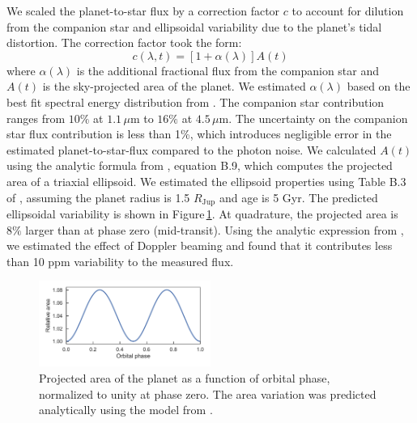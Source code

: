 \documentclass[twocolumn]{aastex61}
\begin{document}
We scaled the planet-to-star flux by a correction factor $c$ to account for dilution from the companion star and ellipsoidal variability due to the planet's tidal distortion. The correction factor took the form: 
\begin{equation}
	c(\lambda, t) = [1 + \alpha(\lambda)]A(t)
\end{equation}
where $\alpha(\lambda)$ is the additional fractional flux from the companion star and $A(t)$ is the sky-projected area of the planet. We estimated $\alpha(\lambda)$ based on the best fit spectral energy distribution from \cite{cartier17}. The companion star contribution ranges from $10\%$ at $1.1\,\mu$m to $16\%$ at $4.5\,\mu$m. The uncertainty on the companion star flux contribution is less than 1\%, which introduces negligible error in the estimated planet-to-star-flux compared to the photon noise.   We calculated $A(t)$ using the analytic formula from \cite{leconte11b}, equation B.9, which computes the projected area of a triaxial ellipsoid. We estimated the ellipsoid properties using Table B.3 of \cite{leconte11a}, assuming the planet radius is 1.5 $R_\mathrm{Jup}$ and age is 5 Gyr. The predicted ellipsoidal variability is shown in Figure\,\ref{fig:ellipsoidal}. At quadrature, the projected area is $8\%$ larger than at phase zero (mid-transit). Using the analytic expression from \cite{loeb03}, we estimated the effect of Doppler beaming and found that it contributes less than 10 ppm variability to the measured flux. 

\begin{figure}
\includegraphics[width = 0.5\textwidth]{Figures/ellipsoidal.pdf}
\caption{Projected area of the planet as a function of orbital phase, normalized to unity at phase zero. The area variation was predicted analytically using the model from \cite{leconte11b}.}
\label{fig:ellipsoidal}
\end{figure}
\end{document}
